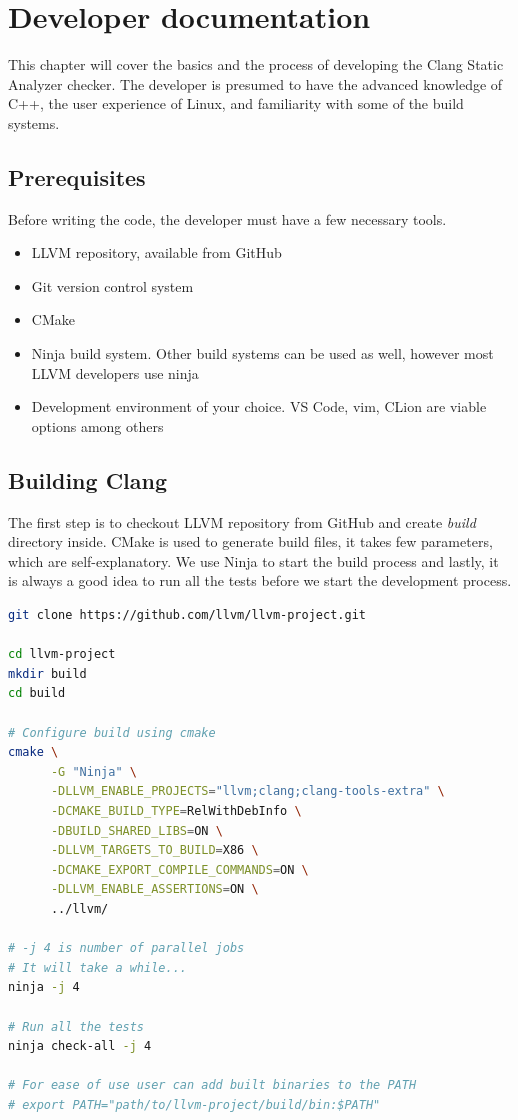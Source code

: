 \chapter{Developer documentation} %
\label{ch:impl}

This chapter will cover the basics and the process of developing the Clang Static Analyzer checker. The developer is presumed to have the advanced knowledge of C++, the user experience of Linux, and familiarity with some of the build systems.


\section{Prerequisites}

Before writing the code, the developer must have a few necessary tools.


\begin{itemize}
    \item LLVM repository, available from GitHub \cite{llvm-project}
    \item Git version control system \cite{git}
    \item CMake
    \item Ninja build system. Other build systems can be used as well, however most LLVM developers use ninja 
    \item Development environment of your choice. VS Code, vim, CLion are viable options among others
\end{itemize}


\section{Building Clang} \label{build-clang}

The first step is to checkout LLVM repository from GitHub and create \emph{build}
directory inside. CMake is used to generate build files, it takes few parameters, which are self-explanatory. We use Ninja to start the build process and lastly, it is always a good idea to run all the tests before we start the development process.

\begin{lstlisting}[language={bash}]
git clone https://github.com/llvm/llvm-project.git

cd llvm-project
mkdir build
cd build

# Configure build using cmake
cmake \
      -G "Ninja" \
      -DLLVM_ENABLE_PROJECTS="llvm;clang;clang-tools-extra" \
      -DCMAKE_BUILD_TYPE=RelWithDebInfo \
      -DBUILD_SHARED_LIBS=ON \
      -DLLVM_TARGETS_TO_BUILD=X86 \
      -DCMAKE_EXPORT_COMPILE_COMMANDS=ON \
      -DLLVM_ENABLE_ASSERTIONS=ON \
      ../llvm/

# -j 4 is number of parallel jobs
# It will take a while...
ninja -j 4

# Run all the tests
ninja check-all -j 4

# For ease of use user can add built binaries to the PATH
# export PATH="path/to/llvm-project/build/bin:$PATH"
\end{lstlisting}


